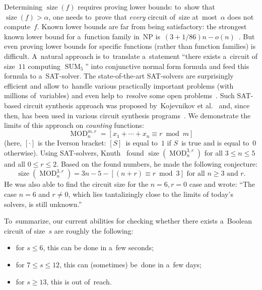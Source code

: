 \documentclass[12pt,letterpaper]{article}
\DeclareMathOperator{\SUM}{SUM}
\DeclareMathOperator{\MOD}{MOD}
\DeclareMathOperator{\size}{size}
\begin{document}

Determining $\size(f)$ requires
proving lower bounds:
to~show that $\size(f)> \alpha$,
one needs to~prove that \emph{every} circuit
of~size at~most~$\alpha$ does not compute~$f$.
Known lower bounds are far from being satisfactory:
the strongest known lower bound for a~function family
in~NP is~$(3+1/86)n-o(n)$~\cite{}. But even proving
lower bounds for specific functions (rather than function families) is difficult. 
A~natural approach is to~translate a~statement ``there exists a~circuit of size~$11$ computing $\SUM_5$'' into conjunctive normal form formula and feed this formula
to a~SAT-solver. The state-of-the-art SAT-solvers are surprisingly efficient and allow to~handle
various practically important problems (with millions
of~variables) and even help to~resolve some open
problems~\cite{}. Such SAT-based circuit synthesis approach was proposed by~Kojevnikov et al.~\cite{}
and, since then, has been used in various circuit synthesis programs~\cite{}. We demonstrate the limits
of this approach on \emph{counting} functions:
\[\MOD_n^{m,r}=[x_1+\dotsb+x_n \equiv r \bmod m]\]
(here, $[\cdot]$ is the Iverson bracket: $[S]$~is equal to~$1$ if $S$~is true and is equal to~$0$ otherwise).
Using SAT-solvers, Knuth~\cite[solution to exercise~$480$]{Knuth:2015:ACP:2898950}
found $\size(\MOD_n^{3,r})$ for all $3 \le n \le 5$ and all $0 \le r \le 2$. Based on the found numbers, he made the following conjecture:
\begin{equation}\label{conjecture}
\size(\MOD_n^{3,r})=3n-5-[(n+r) \equiv r\bmod 3] \text{ for all $n \ge 3$ and $r$.}
\end{equation}
He was also able to find the circuit size 
for the $n=6,r=0$ case and wrote: ``The case $n=6$ and $r \neq 0$, which lies tantalizingly close to the limits of 
today's solvers, is still unknown.'' 

To~summarize, our current abilities for checking whether there exists a~Boolean circuit of size~$s$ are roughly the following: 
\begin{itemize}
\item for $s \le 6$, this can be done in a~few seconds;
\item for $7 \le s \le 12$, this can (sometimes) 
be~done in a~few days;
\item for $s \ge 13$, this is out of~reach.
\end{itemize}
\end{document}
